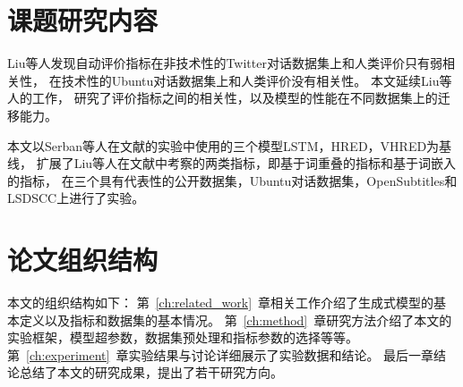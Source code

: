 \section{课题研究内容}\label{sec:reseach_content}
Liu等人发现自动评价指标在非技术性的Twitter对话数据集上和人类评价只有弱相关性，
在技术性的Ubuntu对话数据集上和人类评价没有相关性。
本文延续Liu等人的工作，
研究了评价指标之间的相关性，以及模型的性能在不同数据集上的迁移能力。

本文以Serban等人在文献\cite{VHRED}的实验中使用的三个模型LSTM，HRED，VHRED为基线，
扩展了Liu等人在文献\cite{HowNot}中考察的两类指标，即基于词重叠的指标和基于词嵌入的指标，
在三个具有代表性的公开数据集，Ubuntu对话数据集，OpenSubtitles和LSDSCC上进行了实验。

\section{论文组织结构}\label{sec:paper_organization}
本文的组织结构如下：
第~\ref{ch:related_work}~章相关工作介绍了生成式模型的基本定义以及指标和数据集的基本情况。
第~\ref{ch:method}~章研究方法介绍了本文的实验框架，模型超参数，数据集预处理和指标参数的选择等等。
第~\ref{ch:experiment}~章实验结果与讨论详细展示了实验数据和结论。
最后一章结论总结了本文的研究成果，提出了若干研究方向。
